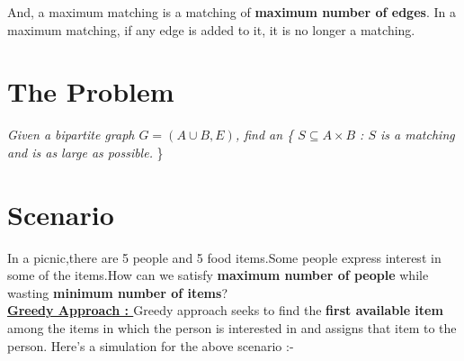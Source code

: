 \documentclass{article}
\begin{document}
And, a maximum matching is a matching of \textbf{maximum number of edges}. In a maximum matching, if any edge is added to it, it is no longer a matching.

\section{The Problem}
\textit{
Given a bipartite graph $G = (A \cup B, E)$, find an \{ $S \subseteq A \times B$ : $S$ is a matching and is as large as possible.} \} \cite{kleinberg2006algorithm}

\newpage

\section{Scenario}
In a picnic,there are 5 people and 5 food items.Some people express interest in some of the items.How can we satisfy \textbf{maximum number of people} while wasting \textbf{minimum number of items}?
\vspace{5mm}
\\ \textbf{\underline{Greedy Approach : }} Greedy approach seeks to find the \textbf{first available item} among the items in which the person is interested in and assigns that item to the person. Here's a simulation for the above scenario :- 
\end{document}
